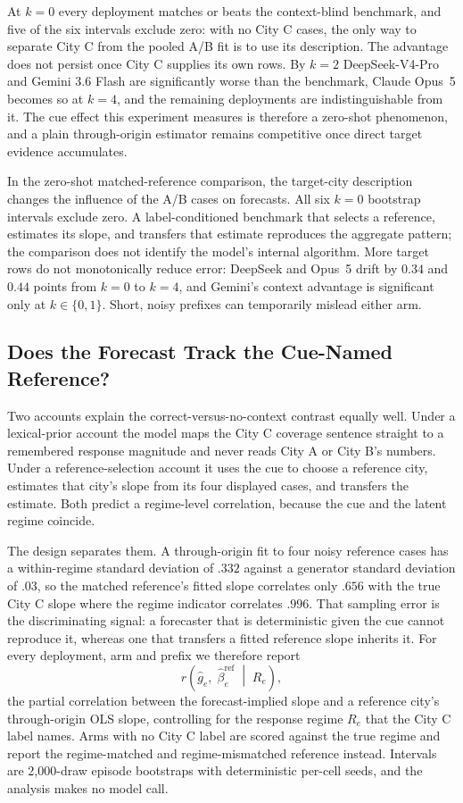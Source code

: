 At $k=0$ every deployment matches or beats the context-blind benchmark, and five
of the six intervals exclude zero: with no City C cases, the only way to separate
City C from the pooled A/B fit is to use its description. The advantage does not
persist once City C supplies its own rows. By $k=2$ DeepSeek-V4-Pro and Gemini 3.6
Flash are significantly worse than the benchmark, Claude Opus~5 becomes so at
$k=4$, and the remaining deployments are indistinguishable from it. The cue effect
this experiment measures is therefore a zero-shot phenomenon, and a plain
through-origin estimator remains competitive once direct target evidence
accumulates.

In the zero-shot matched-reference comparison, the target-city description changes
the influence of the A/B cases on forecasts. All six $k=0$ bootstrap intervals
exclude zero. A label-conditioned benchmark that selects a reference, estimates
its slope, and transfers that estimate reproduces the aggregate pattern; the
comparison does not identify the model's internal algorithm.
More target rows do not monotonically reduce error: DeepSeek and Opus~5 drift by
$0.34$ and $0.44$ points from $k=0$ to $k=4$, and Gemini's context advantage is
significant only at $k\in\{0,1\}$. Short, noisy prefixes can temporarily mislead
either arm.

\subsection{Does the Forecast Track the Cue-Named Reference?}
\label{app:coin-city-reference-selection}

Two accounts explain the correct-versus-no-context contrast equally well. Under a
lexical-prior account the model maps the City C coverage sentence straight to a
remembered response magnitude and never reads City A or City B's numbers. Under a
reference-selection account it uses the cue to choose a reference city, estimates
that city's slope from its four displayed cases, and transfers the estimate. Both
predict a regime-level correlation, because the cue and the latent regime coincide.

The design separates them. A through-origin fit to four noisy reference cases has
a within-regime standard deviation of $.332$ against a generator standard
deviation of $.03$, so the matched reference's fitted slope correlates only $.656$
with the true City C slope where the regime indicator correlates $.996$. That
sampling error is the discriminating signal: a forecaster that is deterministic
given the cue cannot reproduce it, whereas one that transfers a fitted reference
slope inherits it. For every deployment, arm and prefix we therefore report
\[
  r\!\left(\widehat g_e,\;\widehat\beta^{\mathrm{ref}}_e \;\middle|\; R_e\right),
\]
the partial correlation between the forecast-implied slope and a reference city's
through-origin OLS slope, controlling for the response regime $R_e$ that the City
C label names. Arms with no City C label are scored against the true regime and
report the regime-matched and regime-mismatched reference instead. Intervals are
2,000-draw episode bootstraps with deterministic per-cell seeds, and the analysis
makes no model call.

